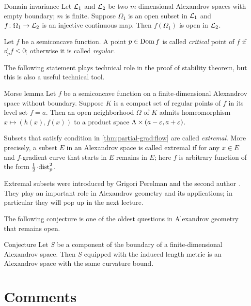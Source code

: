 \begin{thm}{Domain invariance}\label{thm-inv-domain}
Let $\mathcal{L}_1$ and $\mathcal{L}_2$ be two $m$-dimensional Alexandrov spaces with empty boundary; $m$ is finite.
Suppose $\Omega_1$ is an open subset in $\mathcal{L}_1$ and $f\colon\Omega_1\to \mathcal{L}_2$ is an injective continuous map.
Then $f(\Omega_1)$ is open in $\mathcal{L}_2$.
\end{thm}

Let $f$ be a semiconcave function.
A point $p\in \mathop{\rm Dom}\nolimits f$ is called \emph{critical} point of $f$ if $\dd_pf\le 0$; 
otherwise it is called \emph{regular}.

The following statement plays technical role in the proof of stability theorem,
but this is also a useful technical tool.

\begin{thm}{Morse lemma}
Let $f$ be a semiconcave function on a finite-dimensional Alexandrov space without boundary.
Suppose $K$ is a compact set of regular points of $f$ in its level set $f=a$.
Then an open neighborhood $\Omega$ of $K$ admits homeomorphism $x\mapsto (h(x),f(x))$ to a product space $\Lambda\times (a-\varepsilon,a+\varepsilon)$.
\end{thm}

Subsets that satisfy condition in \ref{thm:partial-grad:flow} are called \emph{extremal}.
More precisely, a subset $E$ in an Alexandrov space is called extremal if for any $x\in E$
and $f$-gradient curve that starts in $E$ remains in $E$;
here $f$ is arbitrary function of the form $\tfrac12\cdot \distfun_p^2$.

Extremal subsets were introduced by Grigori Perelman and the second author \cite{perelman-petrunin}.
They play an important role in Alexandrov geometry and its applications;
in particular they will pop up in the next lecture.

The following conjecture is one of the oldest questions in Alexandrov geometry that remains open.

\begin{thm}{Conjecture}
Let $S$ be a component of the boundary of a finite-dimensional Alexandrov space.
Then $S$ equipped with the induced length metric is an Alexandrov space with the same curvature bound.
\end{thm}

\section{Comments}

